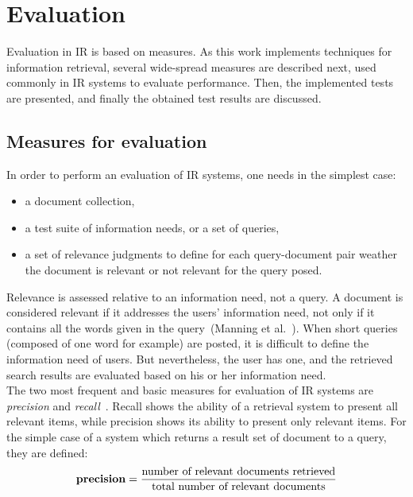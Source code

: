 \chapter{Evaluation}
\label{chapter:evaluation}

Evaluation in \gls{IR} is based on measures. As this work implements techniques for information retrieval, several wide-spread measures are described next, used commonly in \gls{IR} systems to evaluate performance. Then, the implemented tests are presented, and finally the obtained test results are discussed. \\


\section{Measures for evaluation}
In order to perform an evaluation of \gls{IR} systems, one needs in the simplest case:
\begin{itemize}
\item a document collection, 
\item a test suite of information needs, or a set of queries,
\item a set of relevance judgments to define for each query-document pair weather the document is relevant or not relevant for the query posed.
\end{itemize} 

Relevance is assessed relative to an information need, not a query. A document is considered relevant if it addresses the users' information need, not only if it contains all the words given in the query~(Manning et al.~\cite{Mann08}). When short queries (composed of one word for example) are posted, it is difficult to define the information need of users. But nevertheless, the user has one, and the retrieved search results are evaluated based on his or her information need. \\

The two most frequent and basic measures for evaluation of \gls{IR} systems are \textit{precision} and \textit{recall}~\cite{IRbook2008}. Recall shows the ability of a retrieval system to present all relevant items, while precision shows its ability to present only relevant items. For the simple case of a system which returns a result set of document to a query, they are defined:  \\

\begin{equation}
\mbox{\textbf{precision}} = \frac{\mbox{number of relevant documents retrieved}} {\mbox{total number of relevant documents}}
\end{equation}



